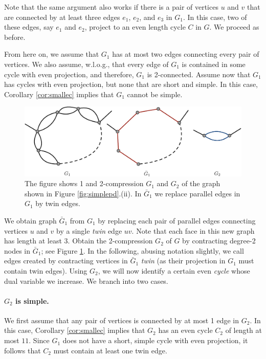 \documentclass{article}
\newcommand{\0}{\mathbb{0}}
\newcommand{\1}{\mathbb{1}}
\begin{document}
Note that the same argument also works if there is a pair of vertices $u$ and $v$ that are connected
by at least three edges $e_1$, $e_2$, and $e_3$ in $G_1$. In this case, two of these edges, say
$e_1$ and $e_2$, project to an even length cycle $C$ in $G$. We proceed as before.

From here on, we assume that $G_1$ has at most two edges connecting every pair of vertices. 
We also assume, w.l.o.g., that every edge of $G_1$ is contained in some cycle with even projection,
and therefore, $G_1$ is 2-connected. Assume now that $G_1$ has cycles with even projection, but none
that are short and simple. In this case, Corollary \ref{cor:smallec} implies that $G_1$
cannot be simple. 

\begin{figure}[ht]
  \begin{center}
    \includegraphics[width=.85\textwidth]{2compress.pdf}
  \end{center}
  \caption{\label{fig:2compress} The figure shows 1 and 2-compression
    $G_1$ and $G_2$ of the graph shown in Figure \ref{fig:simplepd}.(ii). In $\bar{G}_1$ we replace parallel
    edges in $G_1$ by twin edges. }
\end{figure}

We obtain graph $\bar{G}_1$ from $G_1$ by replacing each pair of parallel edges
connecting vertices $u$ and $v$ by a single {\em twin} edge $uv$.
Note that each face in this new graph has length at least 3.
Obtain the 2-compression $G_2$ of
$G$ by contracting degree-2 nodes in $\bar{G}_1$; see Figure
\ref{fig:2compress}. In the following, abusing notation slightly, we
call edges created by contracting vertices in $\bar{G}_1$ {\em
twin} (as their projection in $G_1$ must contain twin edges). Using $G_2$, we will now
identify a certain even {\em cycle} whose dual variable we increase. 
We branch into two
cases. 

\paragraph{$G_2$ is simple.}

We first assume that any pair of vertices is connected by at most 1 edge in $G_2$. 
In this case, Corollary \ref{cor:smallec} implies that $G_2$ has an even cycle $C_2$ 
of length at most $11$. Since $G_1$ does not have a short, simple cycle with even
projection, it follows that $C_2$ must contain at least one twin edge.
\end{document}
